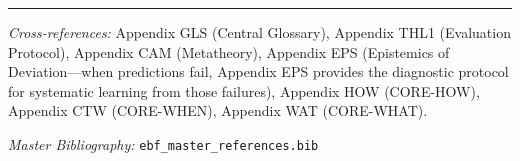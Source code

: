 
\vspace{1em}
\hrule
\vspace{0.5em}

\noindent\textit{Cross-references:}
Appendix GLS (Central Glossary),
Appendix THL1 (Evaluation Protocol),
Appendix CAM (Metatheory),
Appendix EPS (Epistemics of Deviation---when predictions fail, Appendix EPS provides the diagnostic protocol for systematic learning from those failures),
Appendix HOW (CORE-HOW),
Appendix CTW (CORE-WHEN),
Appendix WAT (CORE-WHAT).

\noindent\textit{Master Bibliography:} \texttt{ebf\_master\_references.bib}

